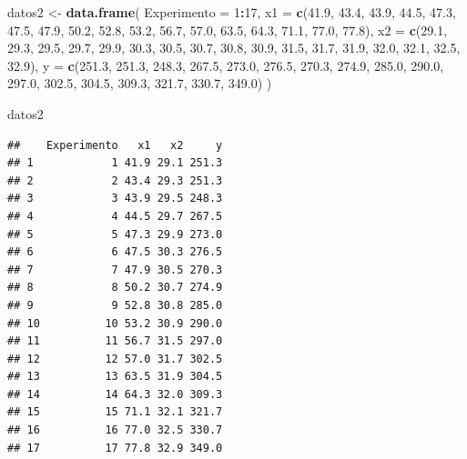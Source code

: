 \documentclass[
]{book}
\newenvironment{Shaded}{\begin{snugshade}}{\end{snugshade}}
\newcommand{\AttributeTok}[1]{\textcolor[rgb]{0.13,0.29,0.53}{#1}}
\newcommand{\DecValTok}[1]{\textcolor[rgb]{0.00,0.00,0.81}{#1}}
\newcommand{\FloatTok}[1]{\textcolor[rgb]{0.00,0.00,0.81}{#1}}
\newcommand{\FunctionTok}[1]{\textcolor[rgb]{0.13,0.29,0.53}{\textbf{#1}}}
\newcommand{\NormalTok}[1]{#1}
\newcommand{\OtherTok}[1]{\textcolor[rgb]{0.56,0.35,0.01}{#1}}
\newcommand{\SpecialCharTok}[1]{\textcolor[rgb]{0.81,0.36,0.00}{\textbf{#1}}}
\begin{document}
\begin{Shaded}
\begin{Highlighting}[]
\NormalTok{datos2 }\OtherTok{\textless{}{-}} \FunctionTok{data.frame}\NormalTok{(}
  \AttributeTok{Experimento =} \DecValTok{1}\SpecialCharTok{:}\DecValTok{17}\NormalTok{,}
  \AttributeTok{x1 =} \FunctionTok{c}\NormalTok{(}\FloatTok{41.9}\NormalTok{, }\FloatTok{43.4}\NormalTok{, }\FloatTok{43.9}\NormalTok{, }\FloatTok{44.5}\NormalTok{, }\FloatTok{47.3}\NormalTok{, }\FloatTok{47.5}\NormalTok{, }\FloatTok{47.9}\NormalTok{, }\FloatTok{50.2}\NormalTok{, }\FloatTok{52.8}\NormalTok{, }\FloatTok{53.2}\NormalTok{, }\FloatTok{56.7}\NormalTok{, }\FloatTok{57.0}\NormalTok{, }\FloatTok{63.5}\NormalTok{, }\FloatTok{64.3}\NormalTok{, }\FloatTok{71.1}\NormalTok{, }\FloatTok{77.0}\NormalTok{, }\FloatTok{77.8}\NormalTok{),}
  \AttributeTok{x2 =} \FunctionTok{c}\NormalTok{(}\FloatTok{29.1}\NormalTok{, }\FloatTok{29.3}\NormalTok{, }\FloatTok{29.5}\NormalTok{, }\FloatTok{29.7}\NormalTok{, }\FloatTok{29.9}\NormalTok{, }\FloatTok{30.3}\NormalTok{, }\FloatTok{30.5}\NormalTok{, }\FloatTok{30.7}\NormalTok{, }\FloatTok{30.8}\NormalTok{, }\FloatTok{30.9}\NormalTok{, }\FloatTok{31.5}\NormalTok{, }\FloatTok{31.7}\NormalTok{, }\FloatTok{31.9}\NormalTok{, }\FloatTok{32.0}\NormalTok{, }\FloatTok{32.1}\NormalTok{, }\FloatTok{32.5}\NormalTok{, }\FloatTok{32.9}\NormalTok{),}
  \AttributeTok{y  =} \FunctionTok{c}\NormalTok{(}\FloatTok{251.3}\NormalTok{, }\FloatTok{251.3}\NormalTok{, }\FloatTok{248.3}\NormalTok{, }\FloatTok{267.5}\NormalTok{, }\FloatTok{273.0}\NormalTok{, }\FloatTok{276.5}\NormalTok{, }\FloatTok{270.3}\NormalTok{, }\FloatTok{274.9}\NormalTok{, }\FloatTok{285.0}\NormalTok{, }\FloatTok{290.0}\NormalTok{, }\FloatTok{297.0}\NormalTok{, }\FloatTok{302.5}\NormalTok{, }\FloatTok{304.5}\NormalTok{, }\FloatTok{309.3}\NormalTok{, }\FloatTok{321.7}\NormalTok{, }\FloatTok{330.7}\NormalTok{, }\FloatTok{349.0}\NormalTok{)}
\NormalTok{)}

\NormalTok{datos2}
\end{Highlighting}
\end{Shaded}

\begin{verbatim}
##    Experimento   x1   x2     y
## 1            1 41.9 29.1 251.3
## 2            2 43.4 29.3 251.3
## 3            3 43.9 29.5 248.3
## 4            4 44.5 29.7 267.5
## 5            5 47.3 29.9 273.0
## 6            6 47.5 30.3 276.5
## 7            7 47.9 30.5 270.3
## 8            8 50.2 30.7 274.9
## 9            9 52.8 30.8 285.0
## 10          10 53.2 30.9 290.0
## 11          11 56.7 31.5 297.0
## 12          12 57.0 31.7 302.5
## 13          13 63.5 31.9 304.5
## 14          14 64.3 32.0 309.3
## 15          15 71.1 32.1 321.7
## 16          16 77.0 32.5 330.7
## 17          17 77.8 32.9 349.0
\end{verbatim}
\end{document}
